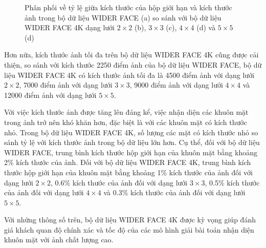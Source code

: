 {\begin{figure}[H]
        \caption{Phân phối về tỷ lệ giữa kích thước của hộp giới hạn và kích thước ảnh trong bộ dữ liệu WIDER FACE \cite{yang2016wider} (a) so sánh với bộ dữ liệu WIDER FACE 4K dạng lưới $2 \times 2$ (b), $3 \times 3$ (c), $4 \times 4$ (d) và $5 \times 5$ (d)}
        \label{fig:widerface_4k_scale}
    \end{figure}

    \noindent
    Hơn nữa, kích thước ảnh tối đa trên bộ dữ liệu WIDER FACE 4K cũng được cải thiện, so sánh với kích thước 2250 điểm ảnh của bộ dữ liệu WIDER FACE, bộ dữ liệu WIDER FACE 4K có kích thước ảnh tối đa là 4500 điểm ảnh với dạng lưới $2 \times 2$, 7000 điểm ảnh với dạng lưới $3 \times 3$, 9000 điểm ảnh với dạng lưới $4 \times 4$ và 12000 điểm ảnh với dạng lưới $5 \times 5$.

    \noindent
    Với việc kích thước ảnh được tăng lên đáng kể, việc nhận diện các khuôn mặt trong ảnh trở nên khó khăn hơn, đặc biệt là với các khuôn mặt có kích thước nhỏ.
    Trong bộ dữ liệu WIDER FACE 4K, số lượng các mặt có kích thước nhỏ so sánh tỷ lệ với kích thước ảnh trong bộ dữ liệu lớn hơn.
    Cụ thể, đối với bộ dữ liệu WIDER FACE, trung bình kích thước hộp giới hạn của khuôn mặt bằng khoảng 2\% kích thước của ảnh.
    Đối với bộ dữ liệu WIDER FACE 4K, trung bình kích thước hộp giới hạn của khuôn mặt bằng khoảng 1\% kích thước của ảnh đối với dạng lưới $2 \times 2$, 0.6\% kích thước của ảnh đối với dạng lưới $3 \times 3$, 0.5\% kích thước của ảnh đối với dạng lưới $4 \times 4$ và 0.3\% kích thước của ảnh đối với dạng lưới $5 \times 5$.

    \noindent
    Với những thông số trên, bộ dữ liệu WIDER FACE 4K được kỳ vọng giúp đánh giá khách quan độ chính xác và tốc độ của các mô hình giải bài toán nhận diện khuôn mặt với ảnh chất lượng cao.
}